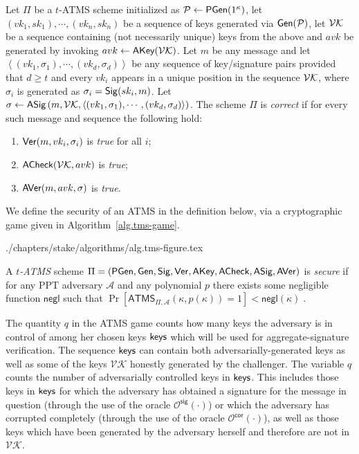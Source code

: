 \begin{definition}
  \label{def:ATMS-correctness}
  Let $\Pi$ be a $t$-ATMS scheme
  initialized as $\mathcal{P} \gets \textsf{PGen}(1^\kappa)$, let
  $(vk_1, sk_1), \cdots, (vk_n, sk_n)$
  be a sequence of keys generated via $\mathsf{Gen}(\mathcal{P})$, let $\mathcal{VK}$ be a sequence
  containing (not necessarily unique) keys from the above and $avk$ be generated
  by invoking $avk \gets \textsf{AKey}(\mathcal{VK})$. Let $m$ be any message and let
  $\left<(vk_1, \sigma_1), \cdots, (vk_d, \sigma_d)\right>$ be any sequence of key/signature pairs provided
  that $d \geq t$ and every $vk_i$ appears in a unique position in the sequence
  $\mathcal{VK}$, where $\sigma_i$ is generated as $\sigma_i = \mathsf{Sig}(sk_i, m)$.
  Let
  $\sigma
  \gets
  \textsf{ASig}\left(
    m,
    \mathcal{VK},
    \left<(vk_1, \sigma_1), \cdots, (vk_d, \sigma_d)\right>
  \right)
  $.
  The scheme $\Pi$ is
  \emph{correct} if for every such message and sequence the following hold:
  \begin{enumerate}
    \item $\mathsf{Ver}(m, vk_i, \sigma_i)$ is \emph{true} for all $i$;
    \item $\textsf{ACheck}(\mathcal{VK}, avk)$ is \emph{true};
    \item $\textsf{AVer}(m, avk, \sigma)$ is \emph{true}.
  \end{enumerate}
\end{definition}

We define the security of an ATMS
in the definition below,
via a cryptographic game given in Algorithm~\ref{alg.tms-game}.

{./chapters/stake/algorithms/alg.tms-figure.tex}

\begin{definition}[Security]
  \label{def:ATMS-security}
  A \textit{$t$-ATMS} scheme
  $\Pi = (
    \textsf{PGen},\allowbreak
    \mathsf{Gen},\allowbreak
    \mathsf{Sig},\allowbreak
    \mathsf{Ver},\allowbreak
    \textsf{AKey},\allowbreak
    \textsf{ACheck},\allowbreak
    \textsf{ASig},\allowbreak
    \textsf{AVer}
  )$
  is \emph{secure} if for any PPT adversary $\mathcal{A}$ and any polynomial $p$
  there exists some negligible function $\textsf{negl}$ such that
  $
    \Pr[ \textsf{ATMS}_{\Pi, \mathcal{A}}(\kappa, p(\kappa)) = 1]
    < \textsf{negl}(\kappa)
    \; .
  $
\end{definition}

The quantity $q$ in the ATMS game counts how many keys the adversary is in
control of among her chosen keys $\textsf{keys}$ which will be used for
aggregate-signature verification. The sequence $\textsf{keys}$ can contain both
adversarially-generated keys as well as some of the keys $\mathcal{VK}$
honestly generated by the challenger. The variable $q$ counts the number of
adversarially controlled keys in $\textsf{keys}$. This includes those keys in
$\textsf{keys}$ for which the adversary has obtained a signature for the message in
question (through the use of the oracle $\mathcal{O}^\mathsf{sig}(\cdot)$) or which the
adversary has corrupted completely (through the use of the oracle
$\mathcal{O}^\mathsf{cor}(\cdot)$), as well as those keys which have been generated by
the adversary herself and therefore are not in $\mathcal{VK}$.

